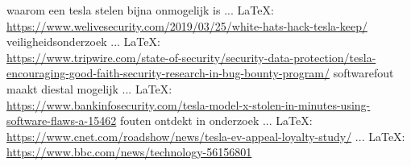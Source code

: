 \begin{thebibliography}{99}
waarom een tesla stelen bijna onmogelijk is
 ... \LaTeX:\\ \url{https://www.welivesecurity.com/2019/03/25/white-hats-hack-tesla-keep/}
veiligheidsonderzoek
 ... \LaTeX:\\ \url{https://www.tripwire.com/state-of-security/security-data-protection/tesla-encouraging-good-faith-security-research-in-bug-bounty-program/}
softwarefout maakt diestal mogelijk
 ... \LaTeX:\\ \url{https://www.bankinfosecurity.com/tesla-model-x-stolen-in-minutes-using-software-flaws-a-15462}
fouten ontdekt in onderzoek
 ... \LaTeX:\\ \url{https://www.cnet.com/roadshow/news/tesla-ev-appeal-loyalty-study/}
 ... \LaTeX:\\ \url{https://www.bbc.com/news/technology-56156801}









\end{thebibliography}

